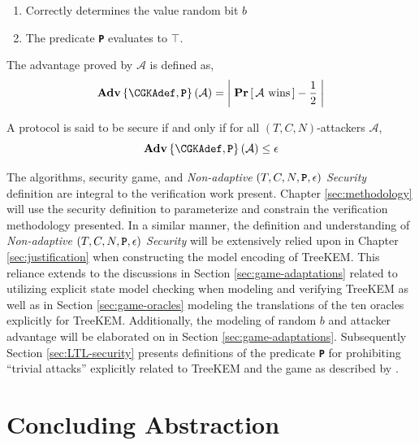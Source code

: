 \begin{enumerate}
\item Correctly determines the value random bit \(b\)
\item The predicate \textbf{\texttt{P}} evaluates to \(\top\).
\end{enumerate}
\vspace{\parsep}

\begin{definition}
The advantage proved by $\mathcal{A}$ is defined as,
$$ \normalfont{\textbf{Adv}}\left\{\CGKAdef,\textbf{\texttt{P}}\right\}(\mathcal{A})  = \left|\; \textbf{Pr}\left[ \,\mathcal{A}\text{ wins}\, \right] - \frac{1}{2} \;\right| $$
\end{definition}

\begin{definition}  
\label{def:CGKA-Security}
A  protocol is said to be secure if and only if for all $(T, C, N)$-attackers $\mathcal{A}$,
$$ \normalfont\textbf{Adv}\left\{\CGKAdef,\textbf{\texttt{P}}\right\}(\mathcal{A}) \leq \epsilon $$
\end{definition}

The  algorithms, security game, and \emph{Non-adaptive} \((T, C, N, \textbf{\texttt{P}}, \epsilon)\) \emph{ Security} definition are integral to the verification work present.
Chapter \ref{sec:methodology} will use the security definition to parameterize and constrain the verification methodology presented.
In a similar manner, the definition and understanding of \emph{Non-adaptive} \((T, C, N, \textbf{\texttt{P}}, \epsilon)\) \emph{ Security} will be extensively relied upon in Chapter \ref{sec:justification} when constructing the model encoding of TreeKEM.
This reliance extends to the discussions in Section \ref{sec:game-adaptations} related to utilizing explicit state model checking when modeling and verifying TreeKEM
as well as in Section \ref{sec:game-oracles} modeling the translations of the ten \CGKAsec oracles explicitly for TreeKEM.
Additionally, the modeling of random \(b\) and attacker advantage will be elaborated on in Section \ref{sec:game-adaptations}.
Subsequently Section \ref{sec:LTL-security} presents definitions of the predicate \textbf{\texttt{P}} for prohibiting ``trivial attacks'' explicitly related to TreeKEM and the  game as described by \autocite{alwen2020security}.


\hypertarget{concluding-abstraction}{%
\section{Concluding Abstraction}\label{concluding-abstraction}}

